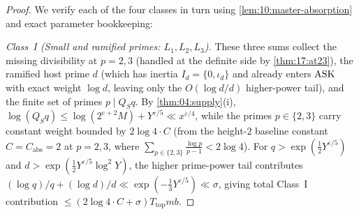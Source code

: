 \begin{proof}
We verify each of the four classes in turn using \cref{lem:10:master-absorption} and exact parameter bookkeeping:

\medskip\noindent
\emph{Class~I (Small and ramified primes: $L_1, L_2, L_3$).}
These three sums collect the missing divisibility at $p = 2, 3$ (handled at the definite side by \cref{thm:17:at23}), the ramified host prime $d$ (which has inertia $I_d = \{0, \iota_d\}$ and already enters $\mathrm{ASK}$ with exact weight $\log d$, leaving only the $O(\log d / d)$ higher-power tail), and the finite set of primes $p \mid Q_S q$. By \cref{thm:04:supply}(i), $\log(Q_S q) \le \log(2^{e+2} M) + Y^{\varepsilon/5} \ll x^{\varepsilon/4}$, while the primes $p \in \{2, 3\}$ carry constant weight bounded by $2\log 4 \cdot C$ (from the height-$2$ baseline constant $C = C_{\mathrm{abs}} = 2$ at $p = 2, 3$, where $\sum_{p \in \{2,3\}} \frac{\log p}{p-1} < 2\log 4$). For $q > \exp(\frac{1}{2}Y^{\varepsilon/5})$ and $d > \exp(\frac{1}{2}Y^{\varepsilon/5}\log^2 Y)$, the higher prime-power tail contributes $(\log q)/q + (\log d)/d \ll \exp(-\frac{1}{3}Y^{\varepsilon/5}) \ll \sigma$, giving total Class~I contribution $\le (2\log 4 \cdot C + \sigma) T_{\mathrm{top}} m b$.


\end{proof}
